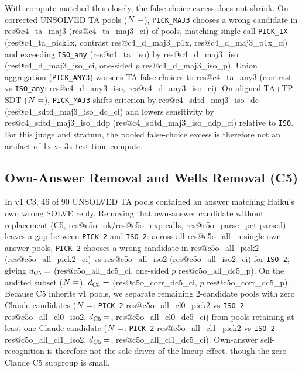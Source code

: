 \documentclass[10pt,twocolumn]{article}
\makeatletter
\newcommand{\res}[1]{\csname res@#1\endcsname}
\makeatother
\begin{document}
With compute matched this closely, the false-choice excess does not shrink. On corrected UNSOLVED TA pools ($N=\res{c4_n_ta}$), \texttt{PICK\_MAJ3} chooses a wrong candidate in \res{c4_ta_maj3} (\res{c4_ta_maj3_ci}) of pools, matching single-call \texttt{PICK\_1X} (\res{c4_ta_pick1x}, contrast \res{c4_d_maj3_p1x}, \res{c4_d_maj3_p1x_ci}) and exceeding \texttt{ISO\_any} (\res{c4_ta_iso}) by \res{c4_d_maj3_iso} (\res{c4_d_maj3_iso_ci}, one-sided $p$ \res{c4_d_maj3_iso_p}). Union aggregation (\texttt{PICK\_ANY3}) worsens TA false choices to \res{c4_ta_any3} (contrast vs \texttt{ISO\_any}: \res{c4_d_any3_iso}, \res{c4_d_any3_iso_ci}). On aligned TA+TP SDT ($N=\res{c4_n_tp}$), \texttt{PICK\_MAJ3} shifts criterion by \res{c4_sdtd_maj3_iso_dc} (\res{c4_sdtd_maj3_iso_dc_ci}) and lowers sensitivity by \res{c4_sdtd_maj3_iso_ddp} (\res{c4_sdtd_maj3_iso_ddp_ci}) relative to \texttt{ISO}. For this judge and stratum, the pooled false-choice excess is therefore not an artifact of 1x vs 3x test-time compute.

\subsection{Own-Answer Removal and Wells Removal (C5)}
In v1 C3, 46 of 90 UNSOLVED TA pools contained an answer matching Haiku's own wrong SOLVE reply. Removing that own-answer candidate without replacement (C5, \res{c5o_ok}/\res{c5o_exp} calls, \res{c5o_parse_pct} parsed) leaves a gap between \texttt{PICK-2} and \texttt{ISO-2}: across all \res{c5o_all_n} single-own-answer pools, \texttt{PICK-2} chooses a wrong candidate in \res{c5o_all_pick2} (\res{c5o_all_pick2_ci}) vs \res{c5o_all_iso2} (\res{c5o_all_iso2_ci}) for \texttt{ISO-2}, giving $d_{\mathrm{C5}} = \res{c5o_all_dc5}$ (\res{c5o_all_dc5_ci}, one-sided $p$ \res{c5o_all_dc5_p}). On the audited subset ($N=\res{c5o_corr_n}$), $d_{\mathrm{C5}} = \res{c5o_corr_dc5}$ (\res{c5o_corr_dc5_ci}, $p$ \res{c5o_corr_dc5_p}). Because C5 inherits v1 pools, we separate remaining 2-candidate pools with zero Claude candidates ($N=\res{c5o_all_cl0_n}$: \texttt{PICK-2} \res{c5o_all_cl0_pick2} vs \texttt{ISO-2} \res{c5o_all_cl0_iso2}, $d_{\mathrm{C5}} = \res{c5o_all_cl0_dc5}$, \res{c5o_all_cl0_dc5_ci}) from pools retaining at least one Claude candidate ($N=\res{c5o_all_cl1_n}$: \texttt{PICK-2} \res{c5o_all_cl1_pick2} vs \texttt{ISO-2} \res{c5o_all_cl1_iso2}, $d_{\mathrm{C5}} = \res{c5o_all_cl1_dc5}$, \res{c5o_all_cl1_dc5_ci}). Own-answer self-recognition is therefore not the sole driver of the lineup effect, though the zero-Claude C5 subgroup is small.
\end{document}
